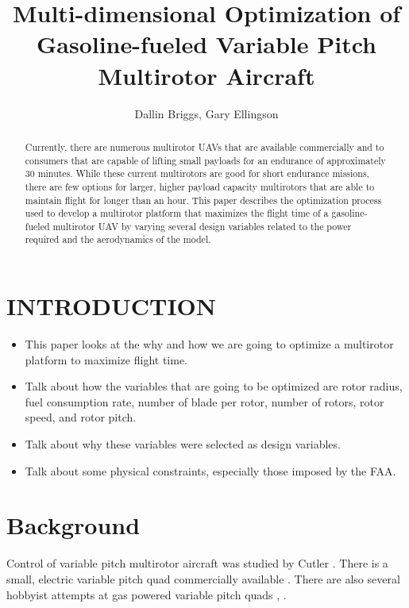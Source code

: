 \documentclass[letterpaper, 10 pt, conference]{ieeeconf}  %
\title{\LARGE \bf
Multi-dimensional Optimization of Gasoline-fueled Variable Pitch Multirotor Aircraft
}
\author{Dallin Briggs, Gary Ellingson%
}
\begin{document}
\maketitle
\thispagestyle{empty}
\pagestyle{empty}


\begin{abstract}

Currently, there are numerous multirotor UAVs that are available commercially and to consumers that are capable of lifting small payloads for an endurance of approximately 30 minutes. While these current multirotors are good for short endurance missions, there are few options for larger, higher payload capacity multirotors that are able to maintain flight for longer than an hour. This paper describes the optimization process used to develop a multirotor platform that maximizes the flight time of a gasoline-fueled multirotor UAV by varying several design variables related to the power required and the aerodynamics of the model.

\end{abstract}


\section{INTRODUCTION}

\begin{itemize}
	\item{This paper looks at the why and how we are going to optimize a multirotor platform to maximize flight time.}
	\item{Talk about how the variables that are going to be optimized are rotor radius, fuel consumption rate, number of blade per rotor, number of rotors, rotor speed, and rotor pitch.}
	\item{Talk about why these variables were selected as design variables.}
	\item{Talk about some physical constraints, especially those imposed by the FAA.}
\end{itemize}


\section{Background}

Control of variable pitch multirotor aircraft was studied by Cutler \cite{Cutler2012}. There is a small, electric variable pitch quad commercially available \cite{stingray2016}.  There are also several hobbyist attempts at gas powered variable pitch quads \cite{diy2016}, \cite{hackaday2016}.
\end{document}
